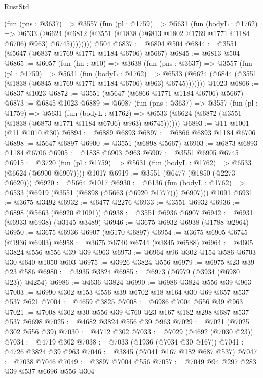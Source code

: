\begin{lexlean}{RustStd}
\begin{coremodule}
        (fun (pns : @3637) =>
        @3557
          (fun (pl : @1759) =>
          @5631
            (fun (bodyL : @1762) =>
            @6533
              (@6624 (@6812 (@3551 (@1838 (@6813 @1802 @1769 @1771 @1184 @6706) @963) @6745))))))))
    @504
@6837 := @6804 @504
@6844 := @3551 (@5647 (@6837 @1769 @1771 @1184 @6706) @5667)
@6845 := @6813 @504
@6865 := @6057
    (fun (hn : @10) =>
    @3638
      (fun (pns : @3637) =>
      @3557
        (fun (pl : @1759) =>
        @5631
          (fun (bodyL : @1762) =>
          @6533 (@6624 (@6844 (@3551 (@1838 (@6845 @1769 @1771 @1184 @6706) @963) @6745)))))))
    @1023
@6866 := @6837 @1023
@6872 := @3551 (@5647 (@6866 @1771 @1184 @6706) @5667)
@6873 := @6845 @1023
@6889 := @6087
    (fun (pns : @3637) =>
    @3557
      (fun (pl : @1759) =>
      @5631
        (fun (bodyL : @1762) =>
        @6533 (@6624 (@6872 (@3551 (@1838 (@6873 @1771 @1184 @6706) @963) @6745))))))
@6893 := @11 @1001 (@11 @1010 @30)
@6894 := @6889 @6893
@6897 := @6866 @6893 @1184 @6706
@6898 := @5647 @6897
@6900 := @3551 (@6898 @5667)
@6903 := @6873 @6893 @1184 @6706
@6905 := @1838 @6903 @963
@6907 := @3551 @6905 @6745
@6915 := @3720
    (fun (pl : @1759) => @5631 (fun (bodyL : @1762) => @6533 (@6624 (@6900 @6907))))
    @1017
@6919 := @3551 (@6477 (@1850 (@2273 @6620)))
@6920 := @5664 @1017
@6930 := @6136
    (fun (bodyL : @1762) => @6533 (@6919 (@3551 (@6898 (@5663 (@6920 @1777))) @6907)))
    @1091
@6931 := @3675 @3492
@6932 := @6477 @2276
@6933 := @3551 @6932
@6936 := @6898 (@5663 (@6920 @1091))
@6938 := @3551 @6936 @6907
@6942 := @6931 (@6933 @6938) (@3145 @3489)
@6946 := @3675 @6932 @6938 (@1788 @2964)
@6950 := @3675 @6936 @6907 (@6170 @6897)
@6954 := @3675 @6905 @6745 (@1936 @6903)
@6958 := @3675 @6740 @6744 (@3845 @6588)
@6964 := @4605 @3824 @556 @556 @39 @39 @963
@6973 := @6964 @96 @302 @154 @586 @6703 @30 @640 @1050 @603
@6975 := @3926 @3824 @556
@6979 := @6975 @23 @39 @23 @586
@6980 := @3935 @3824
@6985 := @6973 (@6979 (@3934 (@6980 @23)) @4254)
@6986 := @4636 @3824
@6990 := @6986 @3824 @556 @39 @963
@7003 := @6990 @302 @153 @556 @39 @6702 @18 @164 @30 @69 @657 @537 @537 @621
@7004 := @4659 @3825
@7008 := @6986 @7004 @556 @39 @963
@7021 := @7008 @302 @30 @556 @39 @760 @23 @167 @182 @298 @687 @537 @537 @6698
@7025 := @4682 @3824 @556 @39 @963
@7029 := @7021 (@7025 @302 @556 @39)
@7030 := @4712 @302
@7033 := @7029 (@4692 (@7030 @23))
@7034 := @4719 @302
@7038 := @7033 (@1936 (@7034 @30 @167))
@7041 := @4726 @3824 @39 @963
@7046 := @3845 (@7041 @167 @182 @687 @537)
@7047 := @7038 @7046
@7049 := @3897 @7004 @556
@7057 := @7049 @94 @297 @283 @39 @537 @6696 @556 @304

\end{coremodule}
\end{lexlean}
